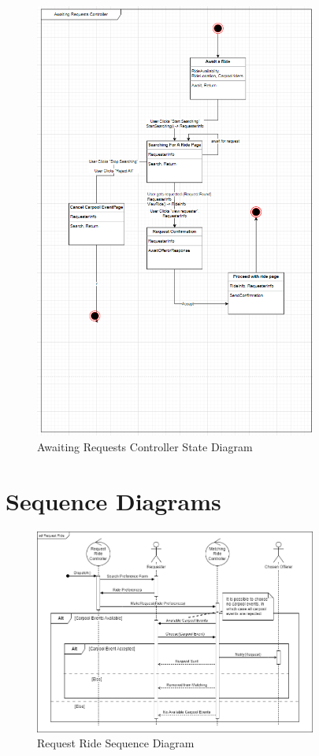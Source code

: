 \documentclass[]{article}
\begin{document}
\begin{figure}[h]
	\centering
	\includegraphics[width=25em]{assets/D3_11.PNG}
	\caption{Awaiting Requests Controller State Diagram}
	\label{fig:acd}
\end{figure}



\pagebreak
\section{Sequence Diagrams}
\label{sec:sequence_diagrams}

\begin{figure}[h]
	\centering
	\includegraphics[width=25em]{assets/D3_12.PNG}
	\caption{Request Ride Sequence Diagram}
	\label{fig:acd}
\end{figure}
\end{document}
